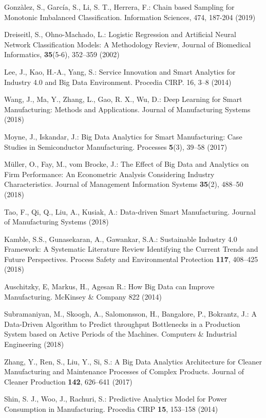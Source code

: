 \documentclass[runningheads]{llncs}
\begin{document}
\begin{thebibliography}{8}
Gonz\`alez, S., Garc\'ia, S., Li, S. T., Herrera, F.: Chain based Sampling for Monotonic Imbalanced Classification. Information Sciences, 474, 187-204 (2019)

Dreiseitl, S., Ohno-Machado, L.: Logistic Regression and Artificial Neural Network Classification Models: A Methodology Review, Journal of Biomedical Informatics, \textbf{35}(5-6), 352--359 (2002)

Lee, J., Kao, H.-A., Yang, S.: Service Innovation and Smart Analytics for Industry 
4.0 and Big Data Environment. Procedia CIRP. 16, 3--8 (2014)

Wang, J., Ma, Y., Zhang, L., Gao, R. X., Wu, D.: Deep Learning for Smart Manufacturing: Methods and Applications. Journal of Manufacturing Systems (2018)

Moyne, J., Iskandar, J.: Big Data Analytics for Smart Manufacturing: Case Studies in Semiconductor Manufacturing. Processes \textbf{5}(3), 39--58 (2017)

M\"uller, O., Fay, M., vom Brocke, J.: The Effect of Big Data and Analytics on Firm Performance: An Econometric Analysis Considering Industry Characteristics. Journal of Management Information Systems \textbf{35}(2), 488--50 (2018)

Tao, F., Qi, Q., Liu, A., Kusiak, A.: Data-driven Smart Manufacturing. Journal of Manufacturing Systems (2018)

Kamble, S.S., Gunasekaran, A., Gawankar, S.A.: Sustainable Industry 4.0 Framework: A Systematic Literature Review Identifying the Current Trends and Future Perspectives. Process Safety and Environmental Protection \textbf{117}, 408--425 (2018) 

Auschitzky, E, Markus, H., Agesan R.: How Big Data can Improve Manufacturing. McKinsey \& Company 822 (2014)

Subramaniyan, M., Skoogh, A., Salomonsson, H., Bangalore, P., Bokrantz, J.: A Data-Driven Algorithm to Predict throughput Bottlenecks in a Production System based on Active Periods of the Machines. Computers \& Industrial Engineering (2018)

Zhang, Y., Ren, S., Liu, Y., Si, S.: A Big Data Analytics Architecture for Cleaner Manufacturing and Maintenance Processes of Complex Products. Journal of Cleaner Production \textbf{142}, 626--641 (2017) 

Shin, S. J., Woo, J., Rachuri, S.: Predictive Analytics Model for Power Consumption in Manufacturing. Procedia CIRP \textbf{15}, 153--158 (2014)


\end{thebibliography}
\end{document}
